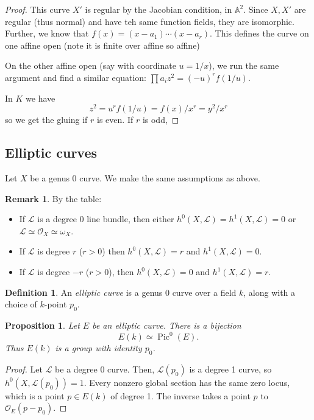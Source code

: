 \documentclass[10pt]{article}
\newtheorem{prop}[thm]{Proposition}
\theoremstyle{definition}
\newtheorem{defn}[thm]{Definition}
\newtheorem{rmk}[thm]{Remark}
\DeclareMathOperator{\Pic}{Pic}
\newcommand{\OO}{\mathcal{O}}
\newcommand{\LL}{\mathcal{L}}
\begin{document}
\begin{proof}
This curve $X'$ is regular by the Jacobian condition, in $\mathbb{A}^2$.  Since $X, X'$ are regular (thus normal) and have teh same function fields, they are isomorphic.  Further, we know that $f(x) = (x-a_1)\cdots(x-a_{r})$.  This defines the curve on one affine open (note it is finite over affine so affine)

On the other affine open (say with coordinate $u=1/x$), we run the same argument and find a similar equation: $\prod a_i z^2 = (-u)^r f(1/u)$.

In $K$ we have
$$z^2 = u^r f(1/u) = f(x)/x^r = y^2/x^r$$
so we get the gluing if $r$ is even.  If $r$ is odd, 
\end{proof}









\subsection{Elliptic curves}

Let $X$ be a genus 0 curve.  We make the same assumptions as above.

\begin{rmk}
By the table:
\begin{itemize}
\item If $\LL$ is a degree 0 line bundle, then either $h^0(X, \LL) = h^1(X, \LL) = 0$ or $\LL \simeq \OO_X \simeq \omega_X$.  
\item If $\LL$ is degree $r$ ($r>0$) then $h^0(X, \LL) = r$ and $h^1(X, \LL) = 0$.
\item If $\LL$ is degree $-r$ ($r > 0$), then $h^0(X, \LL) = 0$ and $h^1(X, \LL) = r$.
\end{itemize}
\end{rmk}

\begin{defn}
An \emph{elliptic curve} is a genus 0 curve over a field $k$, along with a choice of $k$-point $p_0$.
\end{defn}

\begin{prop}
Let $E$ be an elliptic curve.  There is a bijection
$$E(k) \simeq \Pic^0(E).$$
Thus $E(k)$ is a group with identity $p_0$.
\end{prop}
\begin{proof}
Let $\LL$ be a degree 0 curve.  Then, $\LL(p_0)$ is a degree 1 curve, so $h^0(X, \LL(p_0))=1$.   Every nonzero global section has the same zero locus, which is a point $p \in E(k)$ of degree 1.  The inverse takes a point $p$ to $\OO_E(p - p_0)$.
\end{proof}
\end{document}
